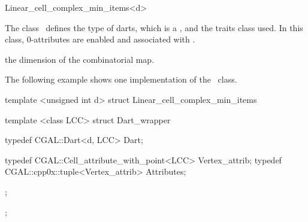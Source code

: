 \ccRefPageBegin

\begin{ccRefClass}{Linear_cell_complex_min_items<d>}


\ccDefinition
  
The class \ccRefName\ defines the type of darts, which is a
, and the traits class used.  In
this class, 0-attributes are enabled and associated with
.

\ccIsModel
{}

\ccParameters
{} the dimension of the combinatorial map.

\ccExample

The following example shows one implementation of the
\ccRefName\ class.

\begin{ccExampleCode}
  template <unsigned int d>
  struct Linear_cell_complex_min_items
  {
    template <class LCC>
    struct Dart_wrapper
    {
      typedef CGAL::Dart<d, LCC> Dart;

      typedef CGAL::Cell_attribute_with_point<LCC> Vertex_attrib;    
      typedef CGAL::cpp0x::tuple<Vertex_attrib> Attributes;
    };
  };
\end{ccExampleCode}

\ccSeeAlso
{}\\

\end{ccRefClass}

\ccRefPageEnd

